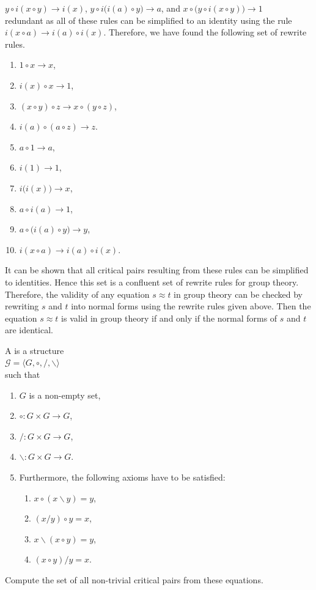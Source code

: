 $y \circ i(x \circ y) \rightarrow i(x)$, \quad
$y \circ i\bigl(i(a)\circ y\bigr) \rightarrow a$, \quad and \quad
$x \circ \bigl(y \circ i(x \circ y)\bigr) \rightarrow 1$
\\[0.2cm]
redundant as all of these rules can be simplified to an identity using the rule $i(x \circ a) \rightarrow i(a) \circ i(x)$.
Therefore, we have found the following set of rewrite rules.
\begin{enumerate}
\item $1 \circ x \rightarrow x$,
\item $i(x) \circ x \rightarrow 1$, 
\item $(x \circ y) \circ z \rightarrow x \circ (y \circ z)$,
\item $i(a) \circ (a \circ z) \rightarrow z$.
\item $a \circ 1 \rightarrow a$,
\item $i(1) \rightarrow 1$,
\item $i\bigl(i(x)\bigr) \rightarrow x$,
\item $a \circ i(a) \rightarrow 1$,
\item $a \circ \bigl(i(a) \circ y\bigr) \rightarrow y$,
\item $i(x \circ a) \rightarrow i(a) \circ i(x)$.
\end{enumerate}
It can be shown that all critical pairs resulting from these rules can be simplified to identities.  Hence this
set is a confluent set of rewrite rules for group theory.  Therefore, the validity of any equation $s \approx t$
in group theory can be checked by rewriting $s$ and $t$ into normal forms using the rewrite rules given  
above.  Then the equation $s \approx t$ is valid in group theory if and only if the normal forms of $s$ and $t$
are identical. 
\eoxs

\exercise
A  is a structure
\\[0.2cm]
\hspace*{1.3cm}
$ \mathcal{G} = \langle G, \circ, /, \backslash \rangle$
\\[0.2cm]
such that
\begin{enumerate}
\item $G$ is a non-empty set,
\item $\circ: G \times G \rightarrow G$,
\item $/: G \times G \rightarrow G$,
\item $\backslash: G \times G \rightarrow G$.
\item Furthermore, the following axioms have to be satisfied:
      \begin{enumerate}
      \item $x \circ (x \backslash y) = y$,
      \item $(x / y) \circ y = x$,
      \item $x \backslash (x \circ y) = y$,
      \item $(x \circ y) /y = x$.
      \end{enumerate}  
\end{enumerate}
Compute the set of all non-trivial critical pairs from these equations.

